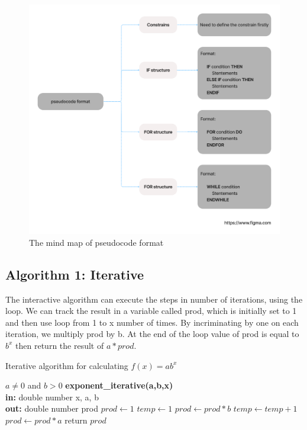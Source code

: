 \documentclass[11pt]{article}
\begin{document}
\begin{figure}[h]
    \centering
    \includegraphics[width=13cm]{images/pseudocodeDesgin.png}
    \caption{The mind map of pseudocode format}
    \label{fig:pseudocode}
\end{figure}

\subsection{Algorithm 1: Iterative}
The interactive algorithm can execute the steps in number of iterations, using the loop. We can track the result in a variable called prod, which is initially set to 1 and then use loop from 1 to x number of times. By incriminating by one on each iteration, we multiply prod by b. At the end of the loop value of prod is equal to $b^x$ then return the result of $a * prod$\cite{xu2015application}.

\begin{algorithm}
  \caption{Iterative algorithm for calculating $f(x) = ab^x$}
  \begin{algorithmic}[1]
  \Require $a \neq 0$ and $b > 0$
    \Function\textbf{\textbf{exponent\_iterative(a,b,x)}}\\
    \textbf{in: }double number x, a, b\\
    \textbf{out: }double number prod
    \State $prod \gets 1$
    \State $temp \gets 1$
        \qquad \State $prod \leftarrow prod*b$
        \qquad \State $temp \leftarrow temp+1$
    \EndFor
    \State $prod \gets prod*a$
    \State return $prod$
    \EndFunction
  \end{algorithmic}
\end{algorithm}
\end{document}
